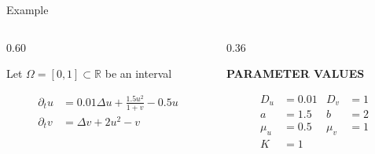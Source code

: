 \begin{frame}{Example}

  \vspace{-0.44cm}

  
  
  \begin{columns}[c,onlytextwidth]
    
    \begin{column}{0.60\textwidth}
      
      {\color{HydraWhite}\fontsize{9.6}{12.1}\selectfont
      Let $\Omega=[0,1] \subset \mathbb{R}$ be an interval
      }

      \vspace{-0.4cm}
      {\color{HydraWhite}\fontsize{10.2}{13}\selectfont
      \begin{align*}
        \partial_tu
        &=
        0.01\Delta u
        +
        \frac{1.5u^2}{1+v}
        -
        0.5u
        \\
        \partial_tv
        &=
        \Delta v
        +
        2u^2
        -
        v
      \end{align*}
      }



    \end{column}

    \begin{column}{0.36\textwidth}

      \vspace{0.5cm}
      \centering

      {\color{HydraMuted}\bfseries\fontsize{7.6}{9.1}\selectfont
        PARAMETER VALUES\par}

      \vspace{-0.30cm}

      {\color{HydraWhite}\fontsize{8.8}{11.2}\selectfont
      \begin{align*}
        D_u&=0.01
        &
        D_v&=1
        \\
        a&=1.5
        &
        b&=2
        \\
        \mu_u&=0.5
        &
        \mu_v&=1
        \\
        K&=1
      \end{align*}
      }


\end{column}
\end{columns}
\end{frame}
